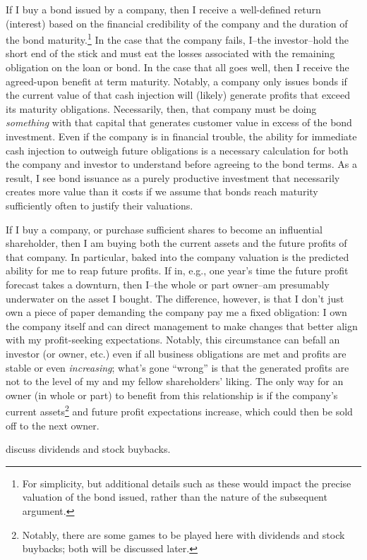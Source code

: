 If I buy a bond issued by a company, then I receive a well-defined return (interest) based on the financial credibility of the company and the duration of the bond maturity.\footnote{For simplicity, but additional details such as these would impact the precise valuation of the bond issued, rather than the nature of the subsequent argument.}  In the case that the company fails, I--the investor--hold the short end of the stick and must eat the losses associated with the remaining obligation on the loan or bond.  In the case that all goes well, then I receive the agreed-upon benefit at term maturity.  Notably, a company only issues bonds if the current value of that cash injection will (likely) generate profits that exceed its maturity obligations.  Necessarily, then, that company must be doing {\it something} with that capital that generates customer value in excess of the bond investment.  Even if the company is in financial trouble, the ability for immediate cash injection to outweigh future obligations is a necessary calculation for both the company and investor to understand before agreeing to the bond terms.  As a result, I see bond issuance as a purely productive investment that necessarily creates more value than it costs if we assume that bonds reach maturity sufficiently often to justify their valuations.  

If I buy a company, or purchase sufficient shares to become an influential shareholder, then I am buying both the current assets and the future profits of that company.  In particular, baked into the company valuation is the predicted ability for me to reap future profits.  If in, e.g., one year's time the future profit forecast takes a downturn, then I--the whole or part owner--am presumably underwater on the asset I bought.  The difference, however, is that I don't just own a piece of paper demanding the company pay me a fixed obligation: I own the company itself and can direct management to make changes that better align with my profit-seeking expectations.  Notably, this circumstance can befall an investor (or owner, etc.) even if all business obligations are met and profits are stable or even {\it increasing}; what's gone ``wrong'' is that the generated profits are not to the level of my and my fellow shareholders' liking.  The only way for an owner (in whole or part) to benefit from this relationship is if the company's current assets\footnote{Notably, there are some games to be played here with dividends and stock buybacks; both will be discussed later.} and future profit expectations increase, which could then be sold off to the next owner.

\note{[Todo]:} discuss dividends and stock buybacks.